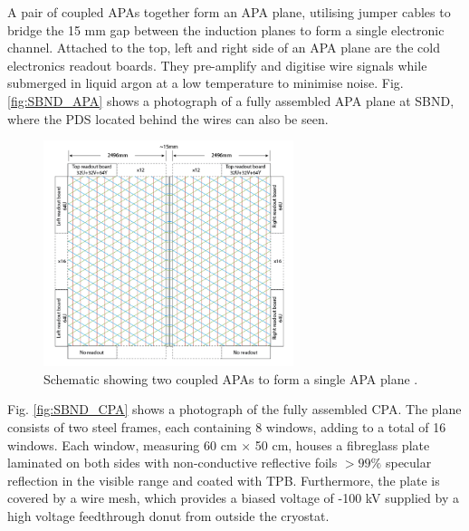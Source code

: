 A pair of coupled APAs together form an APA plane, utilising jumper cables to bridge the 15 mm gap between the induction planes to form a single electronic channel. 
Attached to the top, left and right side of an APA plane are the cold electronics readout boards.
They pre-amplify and digitise wire signals while submerged in liquid argon at a low temperature to minimise noise. 
Fig. \ref{fig:SBND_APA} shows a photograph of a fully assembled APA plane at SBND, where the PDS located behind the wires can also be seen.  

\begin{figure}[hb!] 
\centering    
\includegraphics[width=0.65\textwidth]{SBND_APA}
\caption[Anode Plane Assembly Schematic]{
Schematic showing two coupled APAs to form a single APA plane \cite{SBNProposal}.
}
\label{fig:SBND_APA_diag}
\end{figure}

Fig. \ref{fig:SBND_CPA} shows a photograph of the fully assembled CPA.                                                                                                                                 
The plane consists of two steel frames, each containing 8 windows, adding to a total of 16 windows.                                                                                                    
Each window, measuring 60 cm $\times$ 50 cm, houses a fibreglass plate laminated on both sides with non-conductive reflective foils $> 99\%$ specular reflection in the visible range and coated with TPB.                                                                                                                                                                                                    
Furthermore, the plate is covered by a wire mesh, which provides a biased voltage of -100 kV supplied by a high voltage feedthrough donut from outside the cryostat.                                   
                                                                                                                                                                                                       
